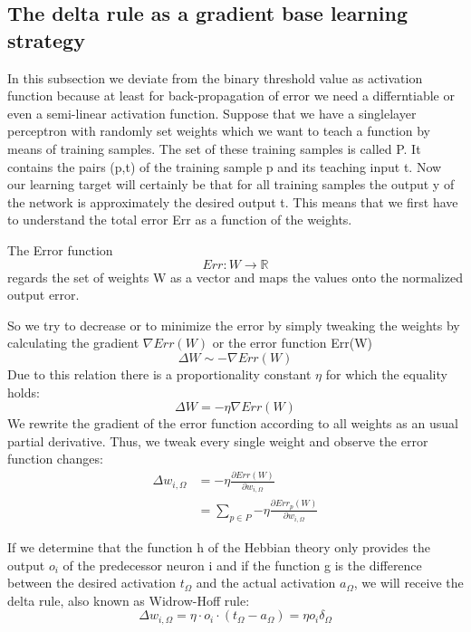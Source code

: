 \subsection{The delta rule as a gradient base learning strategy}
In this subsection we deviate from the binary threshold value as activation function because at least for back-propagation of error we need a differntiable or even a semi-linear activation function. Suppose that we have a singlelayer perceptron with randomly set weights which we want to teach a function by means of training samples. The set of these training samples is called P. It contains the pairs (p,t) of the training sample p and its teaching input t. Now our learning target will certainly be that for all training samples the output y of the network is approximately the desired output t. This means that we first have to understand the total error Err as a function of the weights.
\begin{definition}
    The Error function
    \[ 
        Err : W \longrightarrow \mathbb{R} 
    \]regards the set of weights W as a vector and maps the values onto the normalized output error.
\end{definition}
So we try to decrease or to minimize the error by simply tweaking the weights by calculating the gradient $\nabla Err(W)$ or the error function Err(W)
\[ 
    \Delta W \sim -\nabla Err(W) 
\]Due to this relation there is a proportionality constant $\eta$ for which the equality holds:
\[ 
    \Delta W = -\eta \nabla Err(W) 
\]We rewrite the gradient of the error function according to all weights as an usual partial derivative. Thus, we tweak every single weight and observe the error function changes:
\begin{align*}
    \Delta w_{i,\Omega} &= -\eta \frac{\partial Err(W)}{\partial w_{i,\Omega}}\\
    &=\sum_{p\in P}{-\eta \frac{\partial Err_p(W)}{\partial w_{i,\Omega}}}
\end{align*}
\begin{definition}
    If we determine that the function h of the Hebbian theory only provides the output $o_i$ of the predecessor neuron i and if the function g is the difference between the desired activation $t_\Omega$ and the actual activation $a_\Omega$, we will receive the delta rule, also known as Widrow-Hoff rule:
    \[ 
        \Delta w_{i,\Omega} = \eta \cdot o_i \cdot (t_\Omega -a_\Omega)= \eta o_i \delta_\Omega
    \]
\end{definition}
